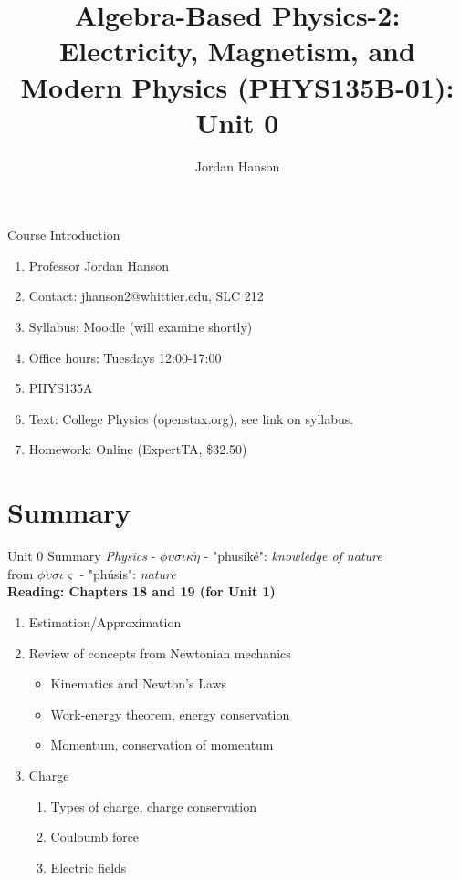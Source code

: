 \documentclass{beamer}
\title{Algebra-Based Physics-2: Electricity, Magnetism, and Modern Physics (PHYS135B-01): Unit 0}
\author{Jordan Hanson}
\institute{Whittier College Department of Physics and Astronomy}
\begin{document}
\maketitle

\begin{frame}{Course Introduction}
\begin{enumerate}
\item Professor Jordan Hanson
\item Contact: jhanson2@whittier.edu, SLC 212
\item Syllabus: Moodle (will examine shortly)
\item Office hours: Tuesdays 12:00-17:00
\item PHYS135A
\item Text: College Physics (openstax.org), see link on syllabus.
\item Homework: Online (ExpertTA, \$32.50)
\end{enumerate}
\end{frame}

\section{Summary}

\begin{frame}{Unit 0 Summary}
\textit{Physics} - $\phi\upsilon\sigma\iota\kappa\acute{\eta}$ - "phusik\'e": \textit{knowledge of nature} \\
from $\phi\acute{\upsilon}\sigma\iota\varsigma$ - "ph\'usis": \textit{nature} \\
\textbf{Reading: Chapters 18 and 19 (for Unit 1)}
\begin{enumerate}
\item Estimation/Approximation
\item Review of concepts from Newtonian mechanics
\begin{itemize}
\item Kinematics and \alert{Newton's Laws}
\item Work-energy theorem, energy conservation
\item Momentum, conservation of momentum
\end{itemize}
\item Charge
\begin{enumerate}
\item Types of charge, charge conservation
\item Couloumb force
\item Electric fields
\end{enumerate}
\end{enumerate}
\end{frame}
\end{document}
